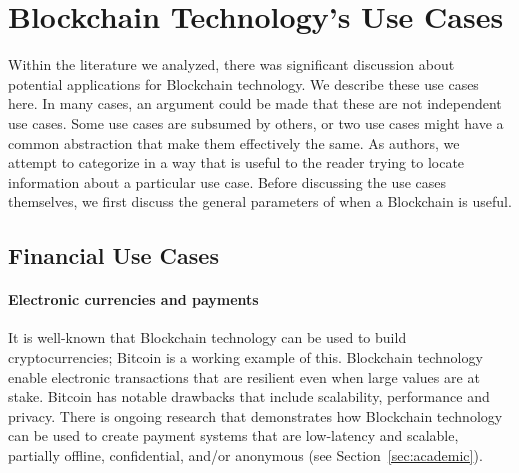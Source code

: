 
\section{Blockchain Technology's Use Cases}
\label{sec:use-cases}

Within the literature we analyzed, there was significant discussion about potential applications for Blockchain technology.
We describe these use cases here.
In many cases, an argument could be made that these are not independent use cases. Some use cases are subsumed by others, or two use cases might have a common abstraction that make them effectively the same.
As authors, we attempt to categorize in a way that is useful to the reader trying to locate information about a particular use case. Before discussing the use cases themselves, we first discuss the general parameters of when a Blockchain is useful. 

\subsection{Financial Use Cases}

\paragraph{Electronic currencies and payments}


It is well-known that Blockchain technology can be used to build cryptocurrencies; Bitcoin is a working example of this.
Blockchain technology enable electronic transactions that are resilient even when large values are at stake.
Bitcoin has notable drawbacks that include scalability, performance and privacy.
There is ongoing research that demonstrates how Blockchain technology can be used to create payment systems that are low-latency and scalable, partially offline, confidential, and/or anonymous (see Section~\ref{sec:academic}).

